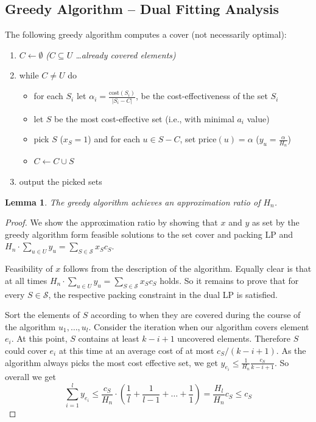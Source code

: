 \documentclass{article}
\newtheorem{lemma}{Lemma}
\begin{document}
\subsection{Greedy Algorithm -- Dual Fitting Analysis}
The following greedy algorithm computes a cover (not necessarily optimal):
\begin{enumerate}
\item $C\leftarrow \emptyset$ \emph{($C\subseteq U$ \dots already covered elements)}
\item while $C\neq U$ do
	\begin{itemize}
	\item for each $S_i$ let $\alpha_i=\frac{\mathrm{cost}(S_i)}{|S_i-C|}$, be the cost-effectiveness of the set $S_i$
	\item let $S$ be the most cost-effective set (i.e., with minimal $a_i$ value)
	\item pick $S$ ($x_S=1$) and for each $u\in S-C$, set $\mathrm{price}(u)=\alpha$ ($y_u=\frac{\alpha}{H_n}$)
	\item $C\leftarrow C \cup S$
	\end{itemize}
\item output the picked sets
\end{enumerate}

\begin{lemma}
The greedy algorithm achieves an approximation ratio of $H_n$.
\end{lemma}
\begin{proof}
We show the approximation ratio by showing that $x$ and $y$ as set by the greedy algorithm form feasible solutions
to the set cover and packing LP and $H_n \cdot \sum_{u \in U} y_u = \sum_{S \in \mathcal{S}} x_S c_S$.

Feasibility of $x$ follows from the description of the algorithm. Equally clear is that at all times 
$H_n \cdot \sum_{u \in U} y_u = \sum_{S \in \mathcal{S}} x_S c_S$ holds. So it remains to prove that
for every $S\in \mathcal{S}$, the respective packing constraint in the dual LP is satisfied.

Sort the elements of $S$ according to when they are covered during the course of the algorithm $u_1, \dots, u_l$. 
Consider the iteration when our algorithm covers element $e_i$. At this point, $S$ contains at least
$k-i+1$ uncovered elements. Therefore $S$ could cover $e_i$ at this time at an average cost of at most
$c_S/(k-i+1)$. As the algorithm always picks the most cost effective set, we get
$y_{e_i} \leq \frac{1}{H_n} \frac{c_S}{k-i+1}$. So overall we get 
\[
\sum_{i=1}^{l} y_{e_i} \leq \frac{c_S}{H_n}\cdot (\frac{1}{l}+\frac{1}{l-1}+\dots +\frac{1}{1})= \frac{H_l}{H_n}c_S\leq c_S
\]

\end{proof}
\end{document}
